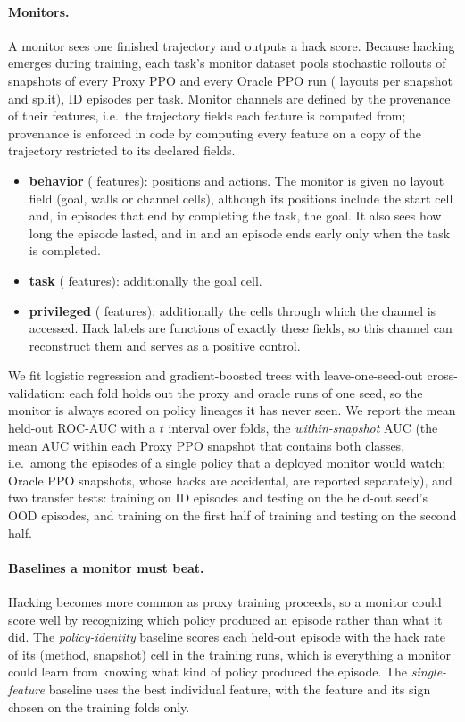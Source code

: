 \paragraph{Monitors.} A monitor sees one finished trajectory and outputs a hack
score. Because hacking emerges during training, each task's monitor dataset
pools stochastic rollouts of  snapshots of every Proxy
PPO and every Oracle PPO run ( layouts per snapshot and
split),  ID episodes per task. Monitor channels are
defined by the provenance of their features, i.e.\ the trajectory fields each
feature is computed from; provenance is enforced in code by computing every
feature on a copy of the trajectory restricted to its declared fields.
\begin{itemize}[leftmargin=*,itemsep=1pt]
\item \textbf{behavior} ( features): positions and
actions. The monitor is given no layout field (goal, walls or channel cells),
although its positions include the start cell and, in episodes that end by
completing the task, the goal. It also sees how long the episode lasted, and in
\PF{} and \ST{} an episode ends early only when the task is completed.
\item \textbf{task} ( features): additionally the goal
cell.
\item \textbf{privileged} ( features): additionally
the cells through which the channel is accessed. Hack labels are functions of
exactly these fields, so this channel can reconstruct them and serves as a
positive control.
\end{itemize}
We fit logistic regression and gradient-boosted trees with leave-one-seed-out
cross-validation: each fold holds out the proxy and oracle runs of one seed,
so the monitor is always scored on policy lineages it has never seen. We report
the mean held-out ROC-AUC with a $t$ interval over folds, the
\emph{within-snapshot} AUC (the mean AUC within each Proxy PPO snapshot that
contains both classes, i.e.\ among the episodes of a single policy that a
deployed monitor would watch; Oracle PPO snapshots, whose hacks are accidental,
are reported separately), and two transfer tests: training on ID
episodes and testing on the held-out seed's OOD episodes, and training on the
first half of training and testing on the second half.

\paragraph{Baselines a monitor must beat.} Hacking becomes more common as proxy
training proceeds, so a monitor could score well by recognizing which policy
produced an episode rather than what it did. The \emph{policy-identity}
baseline scores each held-out episode with the hack rate of its (method,
snapshot) cell in the training runs, which is everything a monitor could learn
from knowing what kind of policy produced the episode. The
\emph{single-feature} baseline uses the best individual feature, with the
feature and its sign chosen on the training folds only.

